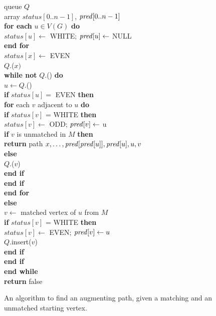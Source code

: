 \begin{figure}
{
\> queue $Q$\\
\> array $status[0..n-1]$, $\operatorname{\text{\textit{pred}}}[0..n-1]$ \\
\> \textbf{for each} $u \in V(G)$ \textbf{do} \\
\> \> $status[u] \gets $ WHITE; $\operatorname{\text{\textit{pred}}}[u] \gets $ NULL \\
\> \textbf{end for}\\
\> $status[x] \gets $ EVEN\\
\> $Q$.($x)$ \\
\> \textbf{while not} $Q$.() \textbf{do}\\
\> \> $u \gets Q$.()\\
%
\> \> \textbf{if} $status[u] =$ EVEN \textbf{then} \\
%
\> \> \> \textbf{for} each $v$ adjacent to $u$ \textbf{do} \\
\> \> \> \> \textbf{if} $status[v]$ = WHITE \textbf{then} \\
\> \> \> \> \> $status[v] \gets$ ODD; $\operatorname{\text{\textit{pred}}}[v] \gets$ u \\
\> \> \> \> \> \textbf{if} $v$ is unmatched in $M$ \textbf{then} \\
\> \> \> \> \> \> \textbf{return} path $x,\ldots, \operatorname{\text{\textit{pred}}}[\operatorname{\text{\textit{pred}}}[u]], \operatorname{\text{\textit{pred}}}[u], u, v$\\
\> \> \> \> \> \textbf{else}\\
\> \> \> \> \> \> $Q$.($v$) \\
\> \> \> \> \> \textbf{end if}\\
\> \> \> \> \textbf{end if}\\
\> \> \> \textbf{end for} \\
%
\> \> \textbf{else}\hspace*{1.5cm}  \\
%
\> \> \> $v \gets$ matched vertex of $u$ from $M$ \\
\> \> \> \textbf{if} $status[v]$ = WHITE \textbf{then} \\
\> \> \> \> $status[v] \gets$ EVEN; $\operatorname{\text{\textit{pred}}}[v] \gets u$ \\
\> \> \> \> $Q$.insert($v$) \\
\> \> \> \textbf{end if}\\

\> \> \textbf{end if}\\
\> \textbf{end while}\\
\> \textbf{return} false\hspace*{1cm}\\
}
\caption[An algorithm to find an augmenting path.]%
{An algorithm to find an augmenting path, given a matching
and an unmatched starting vertex.}
\label{fig:augpath}
\end{figure}

